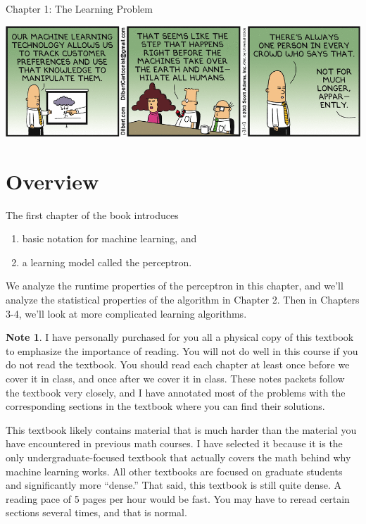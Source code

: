 \documentclass[10pt]{article}
\theoremstyle{definition}
\newtheorem{note}{Note}
\newcommand{\ignore}[1]{}
\begin{document}
\begin{center}
{
\Huge
Chapter 1: The Learning Problem
}

\end{center}

\begin{center}
\includegraphics[width=\textwidth]{dilbert}
\end{center}

\ignore{
Exercise 1.1, 1.2, 1.3, 1.5, 1.6

Memorize the Hoefding Inequality

Exercise 1.11?

Exercise 1.12, 1.13?

Problem 1.2?
}


\section{Overview}

The first chapter of the book introduces
\begin{enumerate}
    \item basic notation for machine learning, and
    \item a learning model called the perceptron.
\end{enumerate}
We analyze the runtime properties of the perceptron in this chapter,
and we'll analyze the statistical properties of the algorithm in Chapter 2.
Then in Chapters 3-4, we'll look at more complicated learning algorithms.

\begin{note}
I have personally purchased for you all a physical copy of this textbook to emphasize the importance of reading.
You will not do well in this course if you do not read the textbook.
You should read each chapter at least once before we cover it in class,
and once after we cover it in class.
These notes packets follow the textbook very closely,
and I have annotated most of the problems with the corresponding sections in the textbook where you can find their solutions.

This textbook likely contains material that is much harder than the material you have encountered in previous math courses.
I have selected it because it is the only undergraduate-focused textbook that actually covers the math behind why machine learning works.
All other textbooks are focused on graduate students and significantly more ``dense.''
That said, this textbook is still quite dense.
A reading pace of 5 pages per hour would be fast.
You may have to reread certain sections several times, and that is normal.
\end{note}
\end{document}
